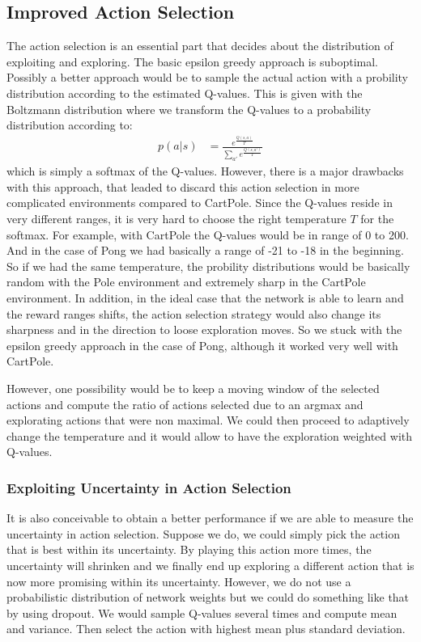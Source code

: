 \subsection{Improved Action Selection}
The action selection is an essential part that decides about the distribution of exploiting and exploring. The basic epsilon greedy approach is suboptimal. Possibly a better approach would be to sample the actual action with a probility distribution according to the estimated Q-values. This is given with the Boltzmann distribution where we transform the Q-values to a probability distribution according to:
\begin{align*}
  p(a | s) &= \frac{e^{\frac{Q(s, a)}{T}}}{\sum_{a'} e^{\frac{Q(s, a')}{T}}}
\end{align*}
which is simply a softmax of the Q-values. However, there is a major drawbacks with this approach, that leaded to discard this action selection in more complicated environments compared to CartPole. Since the Q-values reside in very different ranges, it is very hard to choose the right temperature $T$ for the softmax. For example, with CartPole the Q-values would be in range of 0 to 200. And in the case of Pong we had basically a range of -21 to -18 in the beginning. So if we had the same temperature, the probility distributions would be basically random with the Pole environment and extremely sharp in the CartPole environment. In addition, in the ideal case that the network is able to learn and the reward ranges shifts, the action selection strategy would also change its sharpness and in the direction to loose exploration moves. So we stuck with the epsilon greedy approach in the case of Pong, although it worked very well with CartPole.

However, one possibility would be to keep a moving window of the selected actions and compute the ratio of actions selected due to an argmax and explorating actions that were non maximal. We could then proceed to adaptively change the temperature and it would allow to have the exploration weighted with Q-values.

\subsubsection{Exploiting Uncertainty in Action Selection}
It is also conceivable to obtain a better performance if we are able to measure the uncertainty in action selection. Suppose we do, we could simply pick the action that is best within its uncertainty. By playing this action more times, the uncertainty will shrinken and we finally end up exploring a different action that is now more promising within its uncertainty. However, we do not use a probabilistic distribution of network weights but we could do something like that by using dropout. We would sample Q-values several times and compute mean and variance. Then select the action with highest mean plus standard deviation.

